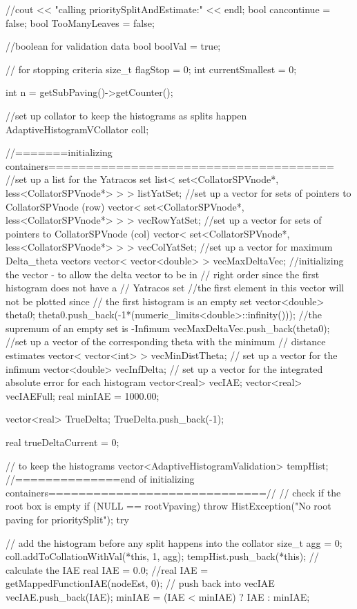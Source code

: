 \begin{DoxyCode}
{
    //cout << "calling prioritySplitAndEstimate:" << endl;
   bool cancontinue = false;
   bool TooManyLeaves = false;
   
    //boolean for validation data
    bool boolVal = true;
    
    // for stopping criteria
    size_t flagStop = 0;
    int currentSmallest = 0;
    
    int n = getSubPaving()->getCounter();
    
    //set up collator to keep the histograms as splits happen
    AdaptiveHistogramVCollator coll;
    
   //=======initializing containers======================================
  //set up a list for the Yatracos set 
  list< set<CollatorSPVnode*, less<CollatorSPVnode*> > > listYatSet;
  //set up a vector for sets of pointers to CollatorSPVnode (row)
  vector< set<CollatorSPVnode*, less<CollatorSPVnode*> > > vecRowYatSet;
  //set up a vector for sets of pointers to CollatorSPVnode (col)
  vector< set<CollatorSPVnode*, less<CollatorSPVnode*> > > vecColYatSet;    
  //set up a vector for maximum Delta_theta vectors
  vector< vector<double> > vecMaxDeltaVec;
  //initializing the vector - to allow the delta vector to be in 
  // right order  since the first histogram does not have a 
  // Yatracos set
  //the first element in this vector will not be plotted since 
  // the first histogram is an empty set
  vector<double> theta0;
  theta0.push_back(-1*(numeric_limits<double>::infinity())); 
  //the supremum of an empty set is -Infimum 
  vecMaxDeltaVec.push_back(theta0);
  //set up a vector of the corresponding theta with the minimum 
  // distance estimates
  vector< vector<int> > vecMinDistTheta;
  // set up a vector for the infimum 
  vector<double> vecInfDelta;
  // set up a vector for the integrated absolute error for each histogram
   vector<real> vecIAE; 
   vector<real> vecIAEFull;
   real minIAE = 1000.00;
   
   vector<real> TrueDelta;
   TrueDelta.push_back(-1); 

  real trueDeltaCurrent = 0;
  
   // to keep the histograms
   vector<AdaptiveHistogramValidation> tempHist;
   //==============end of initializing
       containers=============================//   
   // check if the root box is empty
    if (NULL == rootVpaving) {
            throw HistException("No root paving for prioritySplit");
    }
    try {       
        // add the histogram before any split happens into the collator
        size_t agg = 0;
      coll.addToCollationWithVal(*this, 1, agg);
      tempHist.push_back(*this);
      // calculate the IAE 
      real IAE = 0.0;
      //real IAE = getMappedFunctionIAE(nodeEst, 0);
      // push back into vecIAE 
      vecIAE.push_back(IAE);
      minIAE = (IAE < minIAE) ? IAE : minIAE;
      
}}
\end{DoxyCode}
